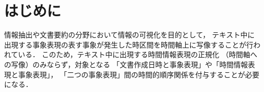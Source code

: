 \documentclass[japanese]{jnlp_1.4}
\newcommand{\modified}[1]{}
\begin{document}
\maketitle


\section{はじめに}
\label{sec:intro}

情報抽出や文書要約の分野において情報の可視化を目的として，
テキスト中に出現する事象表現の表す事象が発生した時区間\modified{(Time Interval)}を時間軸\modified{(Timeline)}上に写像することが行われている．
このため\modified{には}，テキスト中に出現する時間情報表現の正規化
（時間軸への写像）のみならず，対象となる
「文書作成日時と事象表現」や「時間情報表現と事象表現」，
「二つの事象表現」間の時間的順序関係を付与することが必要になる．

\modified{英語においては哲学者・言語学者・人工知能研究者・言語処理研究者が協力し
て時間情報を含む言語資源の整備を進めている\cite{TimeBank}．哲学者・言語学者は言語科学として
(a)テキスト中の事象表現とその時間構造を形式的にどのように記述するかを探究するこ
とを研究目的とする．
人工知能研究者・言語処理研究者は工学研究として(b)テキスト中の事象表現や時間的順
序表現を同定し抽出する機械的なモデルの開発や評価を研究目的とする．
前者にとって (b) は手段でしかなく，逆に後者にとって (a) は手段でしかない．
しかしながら，共通の目標として時間情報の可視化\footnote{ここで
「情報の可視化」とは，工学的な自動処理によるもののみならず，言語科学における形式
意味論研究も含む．}を掲げ，前段落にあげたリサーチクエ
スチョンに対して，「アノテーション」と呼ばれる研究手法により共有言語資源を構築す
る試みが行われている．}

\modified{一方，日本語においては時間情報を含む言語資源の整備は，人工知能研究者・言
語処理研究者によるものが多く，研究目的も (b) の手段としてのものが多い．
機械的なモデルの開発や評価を目的とすることが多く，計算機上に実現しやすい時間情報
表現の切り出しや正規化レベルのアノテーションにとどまっている\cite{IREX,小西-2013}．
時間的順序関係のアノテーションを行うためには，アノテーション対象となる事象構造の
意味論的な形式的な記述の作業が必要となる．人工知能研究者・言
語処理研究者にとっての手段とされる研究目的 (a)が重要になる．
}

\modified{時間情報のアノテーションについては，英語のアノテーション基準
TimeML \cite{TimeML}を元に国際標準化作業が行われてきた．
成果物の ISO-TimeML は策定時に多言語に対してアノテーションすることを想定し，
各言語の研究者がそれぞれ適応\footnote{ここで
「適応」とは生物学における ``種の環境に対応する形質の有無''の意味ではなく，工学に
おける ``対象の特性に対応する仕様やパラメータなどの変更''の意味である．}作業を実施してきた．
}
\end{document}
